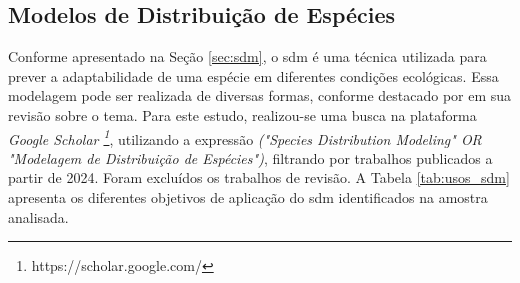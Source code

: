 \subsection{Modelos de Distribuição de Espécies}
Conforme apresentado na Seção \ref{sec:sdm}, o \gls{sdm} é uma técnica utilizada para prever a adaptabilidade de uma espécie em diferentes condições ecológicas. Essa modelagem pode ser realizada de diversas formas, conforme destacado por  em sua revisão sobre o tema.
Para este estudo, realizou-se uma busca na plataforma \textit{Google Scholar \footnote{https://scholar.google.com/}}, utilizando a expressão \textit{("Species Distribution Modeling" OR "Modelagem de Distribuição de Espécies")}, filtrando por trabalhos publicados a partir de 2024. Foram excluídos os trabalhos de revisão. A Tabela \ref{tab:usos_sdm} apresenta os diferentes objetivos de aplicação do \gls{sdm} identificados na amostra analisada.

